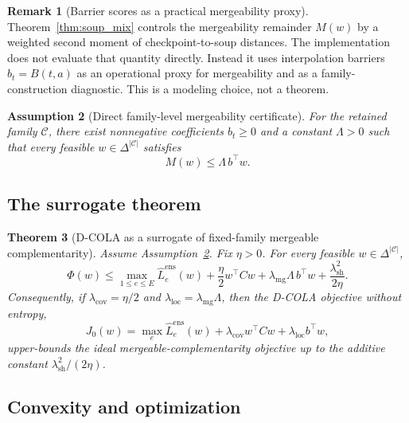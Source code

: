\documentclass{article}
\newtheorem{theorem}{Theorem}[section]
\newtheorem{assumption}[theorem]{Assumption}
\theoremstyle{definition}
\newtheorem{remark}[theorem]{Remark}
\newcommand{\cC}{\mathcal{C}}
\newcommand{\dcola}{\textup{\textsc{D-COLA}}}
\newcommand{\simplex}{\Delta}
\begin{document}
\begin{remark}[Barrier scores as a practical mergeability proxy]
\label{rem:barrier_proxy}
Theorem~\ref{thm:soup_mix} controls the mergeability remainder \(M(w)\) by a weighted second moment of checkpoint-to-soup distances. The implementation does not evaluate that quantity directly. Instead it uses interpolation barriers \(b_t=B(t,a)\) as an operational proxy for mergeability and as a family-construction diagnostic. This is a modeling choice, not a theorem.
\end{remark}

\begin{assumption}[Direct family-level mergeability certificate]
\label{ass:direct_mergeability}
For the retained family \(\cC\), there exist nonnegative coefficients \(b_t\ge 0\) and a constant \(\Lambda>0\) such that every feasible \(w\in\simplex^{|\cC|}\) satisfies
\begin{equation}
M(w)\le \Lambda\, b^\top w.
\label{eq:direct_mergeability}
\end{equation}
\end{assumption}

\subsection{The surrogate theorem}

\begin{theorem}[D-COLA as a surrogate of fixed-family mergeable complementarity]
\label{thm:surrogate}
Assume Assumption~\ref{ass:direct_mergeability}. Fix \(\eta>0\). For every feasible \(w\in\simplex^{|\cC|}\),
\begin{equation}
\Phi(w)
\le
\max_{1\le e\le E}\widehat L_e^{\mathrm{ens}}(w)
+
\frac{\eta}{2}w^\top Cw
+
\lambda_{\mathrm{mg}}\Lambda\, b^\top w
+
\frac{\lambda_{\mathrm{sh}}^2}{2\eta}.
\label{eq:surrogate_bound}
\end{equation}
Consequently, if \(\lambda_{\mathrm{cov}}=\eta/2\) and \(\lambda_{\mathrm{loc}}=\lambda_{\mathrm{mg}}\Lambda\), then the \dcola{} objective without entropy,
\[
J_0(w)=\max_e \widehat L_e^{\mathrm{ens}}(w)+\lambda_{\mathrm{cov}}w^\top Cw+\lambda_{\mathrm{loc}}b^\top w,
\]
upper-bounds the ideal mergeable-complementarity objective up to the additive constant \(\lambda_{\mathrm{sh}}^2/(2\eta)\).
\end{theorem}

\subsection{Convexity and optimization}
\end{document}
